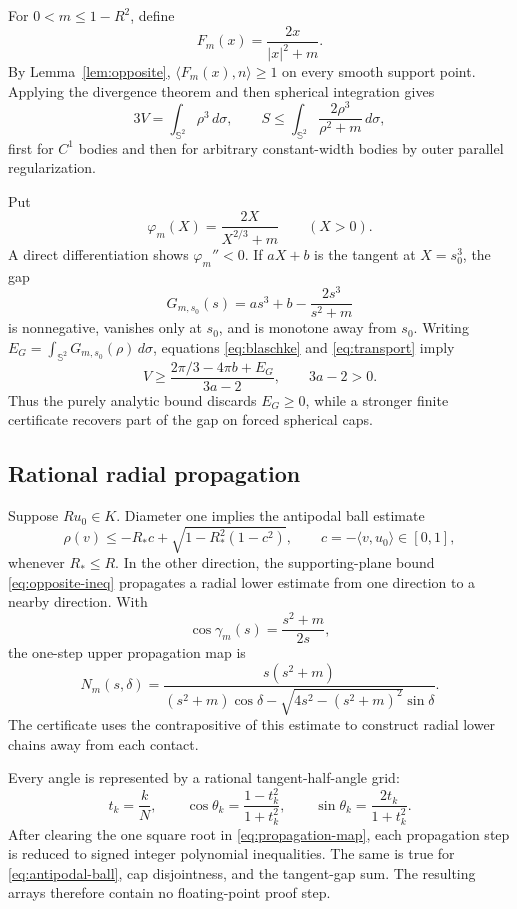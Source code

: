\documentclass[11pt,reqno]{amsart}
\theoremstyle{remark}
\newcommand{\Sph}{\mathbb S^2}
\newcommand{\dd}{\,d\sigma}
\begin{document}
For $0<m\le1-R^2$, define
\[
 F_m(x)=\frac{2x}{|x|^2+m}.
\]
By Lemma~\ref{lem:opposite}, $\langle F_m(x),n\rangle\ge1$ on every smooth
support point.  Applying the divergence theorem and then spherical
integration gives
\begin{equation}\label{eq:transport}
 3V=\int_{\Sph}\rho^3\dd,
 \qquad
 S\le\int_{\Sph}\frac{2\rho^3}{\rho^2+m}\dd,
\end{equation}
first for $C^1$ bodies and then for arbitrary constant-width bodies by outer
parallel regularization.

Put
\[
 \varphi_m(X)=\frac{2X}{X^{2/3}+m}\qquad(X>0).
\]
A direct differentiation shows $\varphi_m''<0$.  If $aX+b$ is the tangent at
$X=s_0^3$, the gap
\[
 G_{m,s_0}(s)=as^3+b-\frac{2s^3}{s^2+m}
\]
is nonnegative, vanishes only at $s_0$, and is monotone away from $s_0$.
Writing $E_G=\int_{\Sph}G_{m,s_0}(\rho)\dd$, equations
\eqref{eq:blaschke} and \eqref{eq:transport} imply
\begin{equation}\label{eq:master}
 V\ge\frac{2\pi/3-4\pi b+E_G}{3a-2},
 \qquad 3a-2>0.
\end{equation}
Thus the purely analytic bound discards $E_G\ge0$, while a stronger finite
certificate recovers part of the gap on forced spherical caps.

\subsection{Rational radial propagation}

Suppose $Ru_0\in K$.  Diameter one implies the antipodal ball estimate
\begin{equation}\label{eq:antipodal-ball}
 \rho(v)\le -R_*c+\sqrt{1-R_*^2(1-c^2)},
 \qquad c=-\langle v,u_0\rangle\in[0,1],
\end{equation}
whenever $R_*\le R$.  In the other direction, the supporting-plane bound
\eqref{eq:opposite-ineq} propagates a radial lower estimate from one direction
to a nearby direction.  With
\[
 \cos\gamma_m(s)=\frac{s^2+m}{2s},
\]
the one-step upper propagation map is
\begin{equation}\label{eq:propagation-map}
 N_m(s,\delta)=
 \frac{s(s^2+m)}{(s^2+m)\cos\delta-
 \sqrt{4s^2-(s^2+m)^2}\sin\delta}.
\end{equation}
The certificate uses the contrapositive of this estimate to construct radial
lower chains away from each contact.

Every angle is represented by a rational tangent-half-angle grid:
\begin{equation}\label{eq:rational-angle}
 t_k=\frac{k}{N},\qquad
 \cos\theta_k=\frac{1-t_k^2}{1+t_k^2},\qquad
 \sin\theta_k=\frac{2t_k}{1+t_k^2}.
\end{equation}
After clearing the one square root in \eqref{eq:propagation-map}, each
propagation step is reduced to signed integer polynomial inequalities.  The
same is true for \eqref{eq:antipodal-ball}, cap disjointness, and the tangent-gap
sum.  The resulting arrays therefore contain no floating-point proof step.
\end{document}
